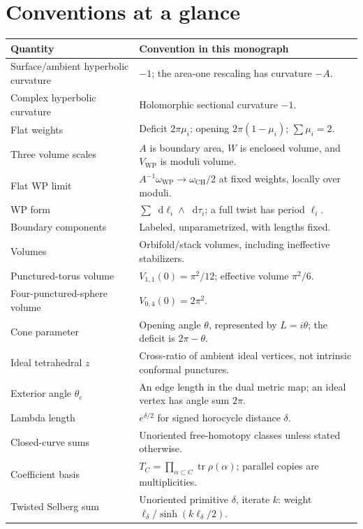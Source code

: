 \documentclass[11pt,a4paper]{article}
\numberwithin{equation}{section}
\theoremstyle{definition}
\theoremstyle{remark}
\DeclareMathOperator{\tr}{tr}
\newcommand{\dd}{\mathop{}\!\mathrm d}
\newcommand{\WP}{\mathrm{WP}}
\begin{document}
\clearpage
\section{Conventions at a glance}
\label{app:conventions}

\begingroup\small
\begin{longtable}{@{}>{\raggedright\arraybackslash}p{}
 >{\raggedright\arraybackslash}p{}@{}}
\toprule
Quantity & Convention in this monograph\\
\midrule
\endhead
Surface/ambient hyperbolic curvature & $-1$; the area-one rescaling has curvature $-A$.\\
Complex hyperbolic curvature & Holomorphic sectional curvature $-1$.\\
Flat weights & Deficit $2\pi\mu_i$; opening $2\pi(1-\mu_i)$; $\sum\mu_i=2$.\\
Three volume scales & $A$ is boundary area, $W$ is enclosed volume, and $V_{\WP}$ is moduli volume.\\
Flat WP limit & $A^{-1}\omega_{\WP}\to\omega_{\mathrm{CH}}/2$ at fixed weights, locally over moduli.\\
WP form & $\sum\dd\ell_i\wedge\dd\tau_i$; a full twist has period $\ell_i$.\\
Boundary components & Labeled, unparametrized, with lengths fixed.\\
Volumes & Orbifold/stack volumes, including ineffective stabilizers.\\
Punctured-torus volume & $V_{1,1}(0)=\pi^2/12$; effective volume $\pi^2/6$.\\
Four-punctured-sphere volume & $V_{0,4}(0)=2\pi^2$.\\
Cone parameter & Opening angle $\theta$, represented by $L=i\theta$; the deficit is $2\pi-\theta$.\\
Ideal tetrahedral $z$ & Cross-ratio of ambient ideal vertices, not intrinsic conformal punctures.\\
Exterior angle $\theta_e$ & An edge length in the dual metric map; an ideal vertex has angle sum $2\pi$.\\
Lambda length & $e^{\delta/2}$ for signed horocycle distance $\delta$.\\
Closed-curve sums & Unoriented free-homotopy classes unless stated otherwise.\\
Coefficient basis & $T_C=\prod_{\alpha\subset C}\tr\rho(\alpha)$; parallel copies are multiplicities.\\
Twisted Selberg sum & Unoriented primitive $\delta$, iterate $k$: weight $\ell_\delta/\sinh(k\ell_\delta/2)$.\\

\end{longtable}
\end{document}
